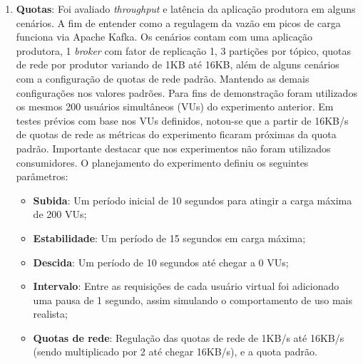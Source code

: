 \documentclass[12pt]{article}
\begin{document}
\begin{enumerate}
    \item \textbf{Quotas}: Foi avaliado \textit{throughput} e latência da aplicação produtora em alguns cenários. A fim de entender como a regulagem da vazão em picos de carga funciona via Apache Kafka. Os cenários contam com uma aplicação produtora, 1 \textit{broker} com fator de replicação 1, 3 partições por tópico, quotas de rede por produtor variando de 1KB até 16KB, além de alguns cenários com a configuração de quotas de rede padrão. Mantendo as demais configurações nos valores padrões. Para fins de demonstração foram utilizados os mesmos 200 usuários simultâneos (VUs) do experimento anterior. Em testes prévios com base nos VUs definidos, notou-se que a partir de 16KB/s de quotas de rede as métricas do experimento ficaram próximas da quota padrão. Importante destacar que nos experimentos não foram utilizados consumidores. O planejamento do experimento definiu os seguintes parâmetros:
    \begin{itemize}
      \item \textbf{Subida}: Um período inicial de 10 segundos para atingir a carga máxima de 200 VUs;
      \item \textbf{Estabilidade}: Um período de 15 segundos em carga máxima;
      \item \textbf{Descida}: Um período de 10 segundos até chegar a 0 VUs;
      \item \textbf{Intervalo}: Entre as requisições de cada usuário virtual foi adicionado uma pausa de 1 segundo, assim simulando o comportamento de uso mais realista;
      \item \textbf{Quotas de rede}: Regulação das quotas de rede de 1KB/s até 16KB/s (sendo multiplicado por 2 até chegar 16KB/s), e a quota padrão.
    \end{itemize}


\end{enumerate}
\end{document}
